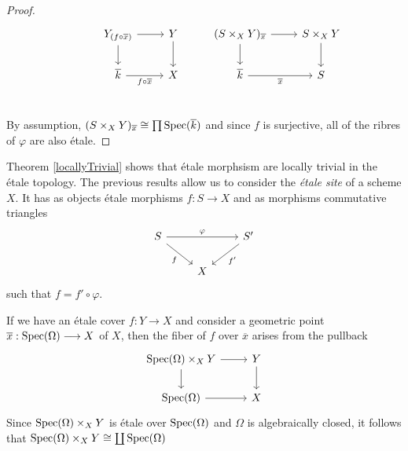 \begin{proof}
\[\begin{tikzcd}
	& {Y_{(f \circ \overline{x})}} & Y & {(S \times_X Y)_{\overline{x}}} & {S \times_X Y} \\
	& {\overline{k}} & X & {\overline{k}} & S \\
	{}
	\arrow[from=1-3, to=2-3]
	\arrow[from=1-2, to=1-3]
	\arrow["{f \circ \overline{x}}"', from=2-2, to=2-3]
	\arrow[from=1-2, to=2-2]
	\arrow[from=1-4, to=2-4]
	\arrow[from=1-4, to=1-5]
	\arrow[from=1-5, to=2-5]
	\arrow["{\overline{x}}"', from=2-4, to=2-5]
\end{tikzcd}
\]
By assumption, $(S\times_X Y)_{\overline{x}} \cong \prod \operatorname{Spec}(\overline{k})$ and since $f$ is surjective, all of the ribres of $\varphi$ are also \'etale.
\end{proof}
Theorem \ref{locallyTrivial} shows that \'etale morphsism are locally trivial in the \'etale topology.
The previous results allow us to consider the \textit{\'etale site} of a scheme $X$. It has as objects \'etale morphisms $f: S \to X$ and as morphisms commutative triangles
\[
\begin{tikzcd}
	S && {S'} \\
	& X
	\arrow["\varphi", from=1-1, to=1-3]
	\arrow["{f'}", from=1-3, to=2-2]
	\arrow["f"', from=1-1, to=2-2]
\end{tikzcd}
\]
 such that $f = f' \circ \varphi$. 
\begin{remark}
  If we have an \'etale cover $f: Y \to X$ and consider a geometric point $\overline{x} : \operatorname{Spec}(\Omega) \longrightarrow X$ of $X$, then the fiber of $f$ over $\overline{x}$ arises from the pullback
    \[\begin{tikzcd}
    	{\Spec(\Omega)\times_X Y} & Y \\
    	{\Spec(\Omega)} & X
    	\arrow[from=1-1, to=2-1]
    	\arrow[from=1-1, to=1-2]
    	\arrow[from=1-2, to=2-2]
    	\arrow[from=2-1, to=2-2]
    \end{tikzcd}\]
  Since $\operatorname{Spec}(\Omega)\times_X Y$ is \'etale over $\operatorname{Spec}(\Omega)$ and $\Omega$ is algebraically closed, it follows that $\operatorname{Spec}(\Omega)\times_X Y \cong \coprod \operatorname{Spec}(\Omega)$
\end{remark}

